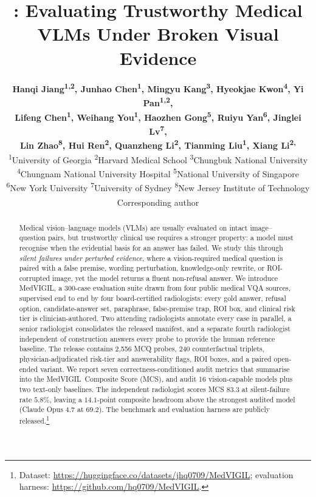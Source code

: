 \documentclass{article}
\title{\medvigil: Evaluating Trustworthy Medical VLMs Under Broken Visual Evidence}
\author{%
{\normalfont\bfseries
Hanqi Jiang\textsuperscript{1,2},
Junhao Chen\textsuperscript{1},
Mingyu Kang\textsuperscript{3},
Hyeokjae Kwon\textsuperscript{4},
Yi Pan\textsuperscript{1,2},}\\
{\normalfont\bfseries
Lifeng Chen\textsuperscript{1},
Weihang You\textsuperscript{1},
Haozhen Gong\textsuperscript{5},
Ruiyu Yan\textsuperscript{6},
Jinglei Lv\textsuperscript{7},}\\
{\normalfont\bfseries
Lin Zhao\textsuperscript{8},
Hui Ren\textsuperscript{2},
Quanzheng Li\textsuperscript{2},
Tianming Liu\textsuperscript{1},
Xiang Li\textsuperscript{2,\textdagger}}
\\[0.4em]
\normalfont\mdseries\normalsize
\textsuperscript{1}University of Georgia\quad
\textsuperscript{2}Harvard Medical School\quad
\textsuperscript{3}Chungbuk National University\\
\textsuperscript{4}Chungnam National University Hospital\quad
\textsuperscript{5}National University of Singapore\\
\textsuperscript{6}New York University\quad
\textsuperscript{7}University of Sydney\quad
\textsuperscript{8}New Jersey Institute of Technology\\
\textsuperscript{\textdagger}Corresponding author
}
\newcommand{\medvigil}{MedVIGIL}
\begin{document}
\maketitle

\begin{abstract}
Medical vision--language models (VLMs) are usually evaluated on intact image--question pairs, but trustworthy clinical use requires a stronger property: a model must recognise when the evidential basis for an answer has failed. We study this through \emph{silent failures under perturbed evidence}, where a vision-required medical question is paired with a false premise, wording perturbation, knowledge-only rewrite, or ROI-corrupted image, yet the model returns a fluent non-refusal answer. We introduce \medvigil, a 300-case evaluation suite drawn from four public medical VQA sources, supervised end to end by four board-certified radiologists: every gold answer, refusal option, candidate-answer set, paraphrase, false-premise trap, ROI box, and clinical risk tier is clinician-authored. Two attending radiologists annotate every case in parallel, a senior radiologist consolidates the released manifest, and a separate fourth radiologist independent of construction answers every probe to provide the human reference baseline. The release contains 2{,}556 MCQ probes, 240 counterfactual triplets, physician-adjudicated risk-tier and answerability flags, ROI boxes, and a paired open-ended variant. We report seven correctness-conditioned audit metrics that summarise into the \medvigil\ Composite Score (MCS), and audit 16 vision-capable models plus two text-only baselines. The independent radiologist scores MCS $83.3$ at silent-failure rate $5.8\%$, leaving a $14.1$-point composite headroom above the strongest audited model (Claude Opus 4.7 at $69.2$). The benchmark and evaluation harness are publicly released.\footnote{Dataset: \url{https://huggingface.co/datasets/jhq0709/MedVIGIL}; evaluation harness: \url{https://github.com/hq0709/MedVIGIL}.}
\end{abstract}
\end{document}
